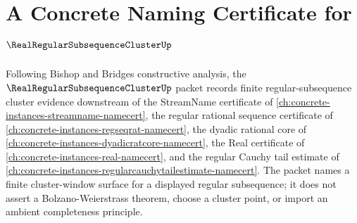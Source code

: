 \chapter{A Concrete Naming Certificate for $\RealRegularSubsequenceClusterUp$}
\label{ch:concrete-instances-real-regular-subsequence-cluster-namecert}

Following Bishop and Bridges constructive analysis, the $\RealRegularSubsequenceClusterUp$ packet records finite regular-subsequence cluster evidence downstream of the StreamName certificate of \autoref{ch:concrete-instances-streamname-namecert}, the regular rational sequence certificate of \autoref{ch:concrete-instances-regseqrat-namecert}, the dyadic rational core of \autoref{ch:concrete-instances-dyadicratcore-namecert}, the Real certificate of \autoref{ch:concrete-instances-real-namecert}, and the regular Cauchy tail estimate of \autoref{ch:concrete-instances-regularcauchytailestimate-namecert}. The packet names a finite cluster-window surface for a displayed regular subsequence; it does not assert a Bolzano-Weierstrass theorem, choose a cluster point, or import an ambient completeness principle.

